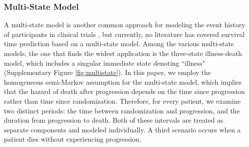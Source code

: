 \documentclass[aoas]{imsart}
\theoremstyle{plain}
\theoremstyle{remark}
\begin{document}
\subsubsection{Multi-State Model} \label{sec:multistate}
A multi-state model is another common approach for modeling the event history of participants in clinical trials \citep{andersen2002multi, meira2009multi, putter2007tutorial}, but currently, no literature has covered survival time prediction based on a multi-state model. Among the various multi-state models, the one that finds the widest application is the three-state illness-death model, which includes a singular immediate state denoting ``illness" (Supplementary Figure \ref{fig:multistate}). In this paper, we employ the homogeneous semi-Markov assumption \citep{cox1977theory} for the multi-state model, which implies that the hazard of death after progression depends on the time since progression rather than time since randomization. Therefore, for every patient, we examine two distinct periods: the time between randomization and progression, and the duration from progression to death. Both of these intervals are treated as separate components and modeled individually. A third scenario occurs when a patient dies without experiencing progression.
\end{document}
